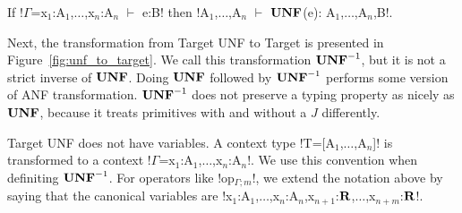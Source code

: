 \begin{lemma}
    If !$\Gamma$=x$_1$:A$_{1}$,$\ldots$,x$_n$:A$_{n}$ $\vdash$ e:B! then
   !A$_{1}$,$\ldots$,A$_{n}$ $\vdash$ $\mathbf{UNF}$(e): A$_{1}$,$\ldots$,A$_{n}$,B!.
\end{lemma}




Next, the transformation from Target UNF to Target is presented in Figure~\ref{fig:unf_to_target}. 
We call this transformation $\mathbf{UNF}^{-1}$, but it is not a strict inverse of $\mathbf{UNF}$.
Doing $\mathbf{UNF}$ followed by $\mathbf{UNF}^{-1}$ performs some version of ANF transformation. 
$\mathbf{UNF}^{-1}$ does not preserve a typing property as nicely as $\mathbf{UNF}$, 
because it treats primitives with and without a $J$ differently.

Target UNF does not have variables. 
A context type !T=[A$_1$,$\ldots$,A$_n$]! is transformed to a context !$\Gamma$=x$_1$:A$_1$,$\ldots$,x$_n$:A$_n$!.
We use this convention when definiting $\mathbf{UNF}^{-1}$. 
For operators like !op$_{\Gamma;m}$!, we extend the notation above by saying that the canonical variables are 
!x$_1$:A$_1$,$\ldots$,x$_n$:A$_n$,x$_{n+1}$:$\mathbf{R}$,$\ldots$,x$_{n+m}$:$\mathbf{R}$!.


